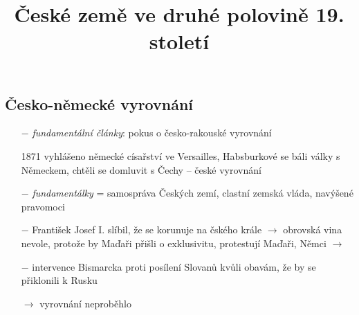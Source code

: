 \documentclass{article}
\title{\vspace{-2cm}České země ve druhé polovině 19. století\vspace{-1.7cm}}
\date{}
\author{}
\begin{document}
\maketitle

\subsection*{Česko-německé vyrovnání}
\begin{itemize}
    \vspace{-0.5em}
    \setlength\itemsep{0.15em}
    \item[$-$] \textit{fundamentální články}: pokus o česko-rakouské vyrovnání
    \item[1871]  vyhlášeno německé císařství ve Versailles, Habsburkové se báli války s Německem, chtěli se domluvit s Čechy -- české vyrovnání
    \item[$-$] \textit{fundamentálky}  = samospráva Českých zemí, clastní zemská vláda, navýšené pravomoci
    \item[$-$] František Josef I. slíbil, že se korunuje na čského krále $\rightarrow$ obrovská vina nevole, protože by Maďaři přišli o exklusivitu, protestují Maďaři, Němci $\rightarrow$
    \item[$-$] intervence Bismarcka proti posílení Slovanů kvůli obavám, že by se přiklonili k Rusku
    \item[$\rightarrow$] vyrovnání neproběhlo
\end{itemize}
\end{document}
